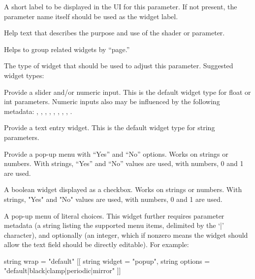 \documentclass[11pt,letterpaper]{book}
\begin{document}
A short label to be displayed in the UI for this parameter.  If not
present, the parameter name itself should be used as the widget label.
\apiend

Help text that describes the purpose and use of the shader or parameter.
\apiend

Helps to group related widgets by ``page.''
\apiend

The type of widget that should be used to adjust this parameter.
Suggested widget types:

\vspace{12pt}
Provide a slider and/or numeric input. This is the default widget type
for {\cf float} or {\cf int} parameters.  Numeric inputs also may be
influenced by the following metadata: , ,
, , , ,
, , .
\apiend
\vspace{-16pt}

\vspace{12pt}
Provide a text entry widget. This is the default widget type for
{\cf string} parameters.
\apiend
\vspace{-16pt}

\vspace{12pt}
Provide a pop-up menu with ``Yes'' and ``No'' options. Works on strings
or numbers.  With strings, ``Yes'' and ``No'' values are used, with
numbers, 0 and 1 are used.
\apiend
\vspace{-16pt}

\vspace{12pt}
A boolean widget displayed as a checkbox. Works on strings or
numbers. With strings, "Yes" and "No" values are used, with numbers,
0 and 1 are used.
\apiend
\vspace{-12pt}

\vspace{12pt}
A pop-up menu of literal choices. This widget further requires
parameter metadata  (a string listing the supported
menu items, delimited by the `{\cf |}' character), and optionally 
(an integer, which if nonzero means the widget should allow the
text field should be directly editable).  For example:
\begin{code}
    string wrap = "default"
        [[ string widget = "popup",
           string options = "default|black|clamp|periodic|mirror" ]]
\end{code}
\apiend
\vspace{-16pt}
\end{document}
